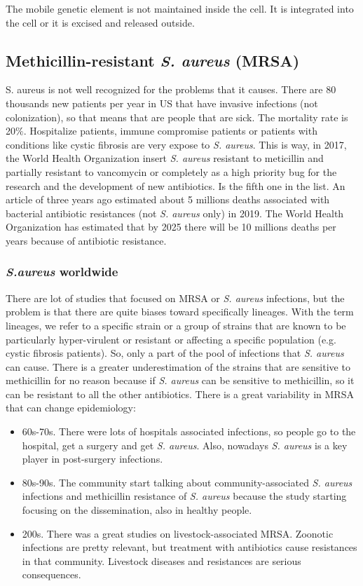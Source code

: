 The mobile genetic element is not maintained inside the cell. It is integrated into the cell or it is excised and released outside.

\subsection{Methicillin-resistant \emph{S. aureus} (MRSA)}
S. aureus is not well recognized for the problems that it causes. There are 80 thousands new patients per year in US that have invasive infections (not colonization), so that means that are people that are sick. The mortality rate is 20$\%$. 
Hospitalize patients, immune compromise patients or patients with conditions like cystic fibrosis are very expose to \emph{S. aureus}. This is way, in 2017, the World Health Organization insert \emph{S. aureus} resistant to meticillin and partially resistant to vancomycin or completely as a high priority bug for the research and the development of new antibiotics. Is the fifth one in the list.
An article of three years ago estimated about 5 millions deaths associated with bacterial antibiotic resistances (not \emph{S. aureus} only) in 2019. The World Health Organization has estimated that by 2025 there will be 10 millions deaths per years because of antibiotic resistance. 

\subsubsection{\emph{S.aureus} worldwide}
There are lot of studies that focused on MRSA or \emph{S. aureus} infections, but the problem is that there are quite biases toward specifically lineages. With the term lineages, we refer to a specific strain or a group of strains that are known to be particularly hyper-virulent or resistant or affecting a specific population (e.g. cystic fibrosis patients). So, only a part of the pool of infections that \emph{S. aureus} can cause. There is a greater underestimation of the strains that are sensitive to methicillin for no reason because if \emph{S. aureus} can be sensitive to methicillin, so it can be resistant to all the other antibiotics. 
There is a great variability in MRSA that can change epidemiology:
\begin{itemize}
    \item 60s-70s. There were lots of hospitals associated infections, so people go to the hospital, get a surgery and get \emph{S. aureus}. Also, nowadays \emph{S. aureus} is a key player in post-surgery infections. 
    \item 80s-90s. The community start talking about community-associated \emph{S. aureus} infections and methicillin resistance of \emph{S. aureus} because the study starting focusing on the dissemination, also in healthy people.
    \item 200s. There was a great studies on livestock-associated MRSA. Zoonotic infections are pretty relevant, but treatment with antibiotics cause resistances in that community. Livestock diseases and resistances are serious consequences.  
\end{itemize}

